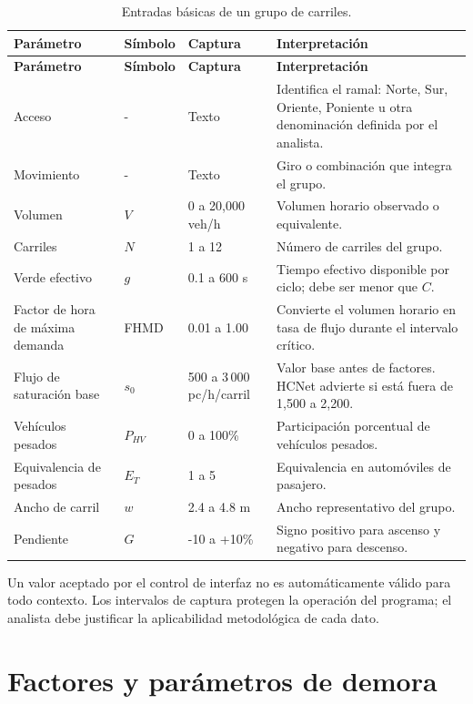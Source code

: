 \documentclass[11pt,letterpaper,oneside,openany]{report}
\begin{document}
\begin{longtable}{@{}L{3.0cm}C{2.0cm}L{2.4cm}L{6.6cm}@{}}
\caption{Entradas básicas de un grupo de carriles.}\label{tab:entradas-basicas}\\
\toprule
{}
\textbf{Parámetro} & \textbf{Símbolo} & \textbf{Captura} & \textbf{Interpretación} \\
\midrule
\endfirsthead
\toprule
{}
\textbf{Parámetro} & \textbf{Símbolo} & \textbf{Captura} & \textbf{Interpretación} \\
\midrule
\endhead
Acceso & - & Texto & Identifica el ramal: Norte, Sur, Oriente, Poniente u
otra denominación definida por el analista. \\
Movimiento & - & Texto & Giro o combinación que integra el grupo. \\
Volumen & $V$ & 0 a 20,000 veh/h & Volumen horario observado o equivalente. \\
Carriles & $N$ & 1 a 12 & Número de carriles del grupo. \\
Verde efectivo & $g$ & 0.1 a 600 s & Tiempo efectivo disponible por ciclo;
debe ser menor que $C$. \\
Factor de hora de máxima demanda & FHMD & 0.01 a 1.00 & Convierte el volumen
horario en tasa de flujo durante el intervalo crítico. \\
Flujo de saturación base & $s_0$ & 500 a 3\,000 pc/h/carril & Valor base antes de
factores. HCNet advierte si está fuera de 1,500 a 2,200. \\
Vehículos pesados & $P_{HV}$ & 0 a 100\% & Participación porcentual de vehículos
pesados. \\
Equivalencia de pesados & $E_T$ & 1 a 5 & Equivalencia en automóviles de pasajero. \\
Ancho de carril & $w$ & 2.4 a 4.8 m & Ancho representativo del grupo. \\
Pendiente & $G$ & -10 a +10\% & Signo positivo para ascenso y negativo para descenso. \\
\bottomrule
\end{longtable}

\begin{warningbox}
Un valor aceptado por el control de interfaz no es automáticamente válido para
todo contexto. Los intervalos de captura protegen la operación del programa; el
analista debe justificar la aplicabilidad metodológica de cada dato.
\end{warningbox}

\section{Factores y parámetros de demora}
\end{document}

